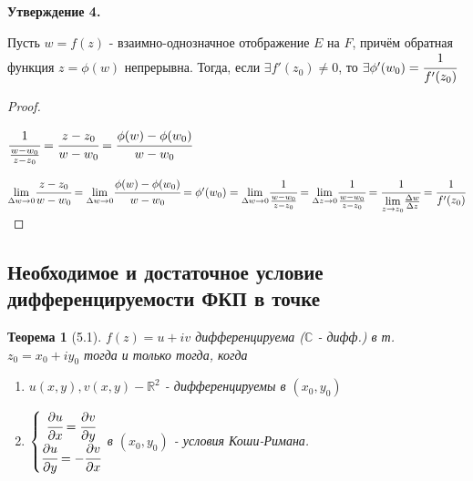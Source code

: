 \documentclass[draft]{report}
\newcommand{\forcenewline}{$\phantom{\mbox{newline}}$}
\newcommand{\dd}{\partial}
\newcommand{\R}{\mathbb{R}}
\renewcommand{\C}{\mathbb{C}}
\newcommand{\mlim}[1]{\underset{#1}{\lim}}
\renewcommand{\f}{\phi}
\newcommand{\D}{\Delta}
\newcommand{\sys}[1]{\left\{\begin{matrix}#1\end{matrix}\right.}
\newtheorem*{theor}{Теорема}
\theoremstyle{remark}
\begin{document}
{\bfseries Утверждение 4.}

Пусть $w=f(z)$ - взаимно-однозначное отображение $E$ на $F$, причём обратная функция $z=\phi(w)$ непрерывна. Тогда, если $\exists f'(z_0)\neq0$, то $\exists \phi'(w_0)=\cfrac{1}{f'(z_0)}$

\begin{proof}
\forcenewline

$\cfrac{1}{\frac{w-w_0}{z-z_0}}=\cfrac{z-z_0}{w-w_0}=\cfrac{\f(w)-\f(w_0)}{w-w_0}$

$\mlim{\D w\to 0}\cfrac{z-z_0}{w-w_0}=\mlim{\D w\to0}\cfrac{\f(w)-\f(w_0)}{w-w_0}=\f'(w_0)=\mlim{\D w\to0}\cfrac{1}{\frac{w-w_0}{z-z_0}}=\mlim{\D z\to0}\cfrac{1}{\frac{w-w_0}{z-z_0}}=\cfrac{1}{\mlim{z\to z_0}\frac{\D w}{\D z}}=\cfrac{1}{f'(z_0)}$
\end{proof}

\subsection{Необходимое и достаточное условие дифференцируемости ФКП в точке}

\begin{theor}[5.1]
$f(z)=u+iv$ дифференцируема ($\C$ - дифф.) в т. $z_0=x_0+iy_0$ тогда и только тогда, когда \begin{enumerate}
\item $u(x,y),v(x,y)-\R^2$ - дифференцируемы в $(x_0,y_0)$
\item $\sys{\cfrac{\dd u}{\dd x}=\cfrac{\dd v}{\dd y} \\ \cfrac{\dd u}{\dd y}=-\cfrac{\dd v}{\dd x}}$ в $(x_0,y_0)$ - условия Коши-Римана.
\end{enumerate}
\end{theor}
\end{document}
